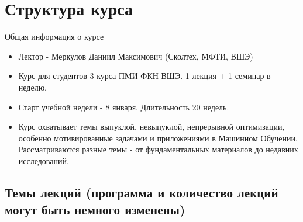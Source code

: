 \documentclass[9pt, aspectratio=169]{beamer}
\begin{document}
\section{Структура курса}
\begin{frame}{Общая информация о курсе}
\begin{minipage}{0.618\textwidth}
    \begin{itemize}
        \item Лектор - Меркулов Даниил Максимович (Сколтех, МФТИ, ВШЭ)
        \item Курс для студентов 3 курса ПМИ ФКН ВШЭ. 1 лекция + 1 семинар в неделю.
        \item Старт учебной недели - 8 января. Длительность 20 недель.
        \item Курс охватывает темы выпуклой, невыпуклой, непрерывной  оптимизации, особенно мотивированные задачами и приложениями в Машинном Обучении. Рассматриваются разные темы - от фундаментальных материалов до недавних исследований.
    \end{itemize}
  \end{minipage}%
  \begin{minipage}{0.382\textwidth}
  \end{minipage}
\end{frame}

\subsection{Темы лекций (программа и количество лекций могут быть немного изменены)}
\end{document}
